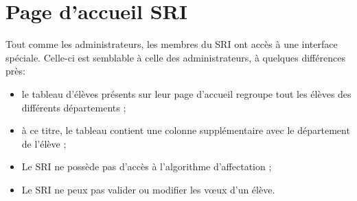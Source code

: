 \section{Page d'accueil SRI}

Tout comme les administrateurs, les membres du SRI ont accès à une interface spéciale. Celle-ci est semblable à celle des administrateurs, à quelques différences près:
\begin{itemize}
 	\item le tableau d'élèves présents sur leur page d'accueil regroupe tout les élèves des différents départements ;
 	\item à ce titre, le tableau contient une colonne supplémentaire avec le département de l'élève ;
 	\item Le SRI ne possède pas d'accès à l'algorithme d'affectation ;
 	\item Le SRI ne peux pas valider ou modifier les vœux d'un élève.
 \end{itemize}